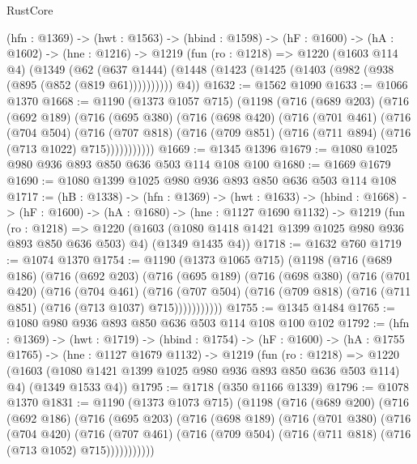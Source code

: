 \begin{lexlean}{RustCore}
\begin{coremodule}
  (hfn : @1369) ->
  (hwt : @1563) ->
  (hbind : @1598) ->
  (hF : @1600) ->
  (hA : @1602) ->
  (hne : @1216) ->
  @1219
    (fun (ro : @1218) =>
    @1220
      (@1603 @114 @4)
      (@1349
        (@62 (@637 @1444) (@1448 (@1423 (@1425 (@1403 (@982 (@938 (@895 (@852 (@819 @61))))))))))
        @4))
@1632 := @1562 @1090
@1633 := @1066 @1370
@1668 := @1190
    (@1373 @1057 @715)
    (@1198
      (@716
        (@689 @203)
        (@716
          (@692 @189)
          (@716
            (@695 @380)
            (@716
              (@698 @420)
              (@716
                (@701 @461)
                (@716
                  (@704 @504)
                  (@716
                    (@707 @818)
                    (@716 (@709 @851) (@716 (@711 @894) (@716 (@713 @1022) @715)))))))))))
@1669 := @1345 @1396
@1679 := @1080 @1025 @980 @936 @893 @850 @636 @503 @114 @108 @100
@1680 := @1669 @1679
@1690 := @1080 @1399 @1025 @980 @936 @893 @850 @636 @503 @114 @108
@1717 := (hB : @1338) ->
  (hfn : @1369) ->
  (hwt : @1633) ->
  (hbind : @1668) ->
  (hF : @1600) ->
  (hA : @1680) ->
  (hne : @1127 @1690 @1132) ->
  @1219
    (fun (ro : @1218) =>
    @1220 (@1603 (@1080 @1418 @1421 @1399 @1025 @980 @936 @893 @850 @636 @503) @4) (@1349 @1435 @4))
@1718 := @1632 @760
@1719 := @1074 @1370
@1754 := @1190
    (@1373 @1065 @715)
    (@1198
      (@716
        (@689 @186)
        (@716
          (@692 @203)
          (@716
            (@695 @189)
            (@716
              (@698 @380)
              (@716
                (@701 @420)
                (@716
                  (@704 @461)
                  (@716
                    (@707 @504)
                    (@716 (@709 @818) (@716 (@711 @851) (@716 (@713 @1037) @715)))))))))))
@1755 := @1345 @1484
@1765 := @1080 @980 @936 @893 @850 @636 @503 @114 @108 @100 @102
@1792 := (hfn : @1369) ->
  (hwt : @1719) ->
  (hbind : @1754) ->
  (hF : @1600) ->
  (hA : @1755 @1765) ->
  (hne : @1127 @1679 @1132) ->
  @1219
    (fun (ro : @1218) =>
    @1220 (@1603 (@1080 @1421 @1399 @1025 @980 @936 @893 @850 @636 @503 @114) @4) (@1349 @1533 @4))
@1795 := @1718 (@350 @1166 @1339)
@1796 := @1078 @1370
@1831 := @1190
    (@1373 @1073 @715)
    (@1198
      (@716
        (@689 @200)
        (@716
          (@692 @186)
          (@716
            (@695 @203)
            (@716
              (@698 @189)
              (@716
                (@701 @380)
                (@716
                  (@704 @420)
                  (@716
                    (@707 @461)
                    (@716 (@709 @504) (@716 (@711 @818) (@716 (@713 @1052) @715)))))))))))

\end{coremodule}
\end{lexlean}
